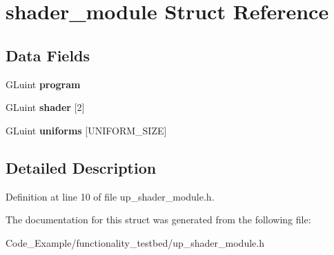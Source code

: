 \hypertarget{structshader__module}{}\section{shader\+\_\+module Struct Reference}
\label{structshader__module}
\subsection*{Data Fields}
\begin{DoxyCompactItemize}
\item 
\hypertarget{structshader__module_a27d8510c93324412d38a888eddee2852}{}G\+Luint {\bfseries program}\label{structshader__module_a27d8510c93324412d38a888eddee2852}

\item 
\hypertarget{structshader__module_ab70b84ace031933b1b360b4e0942ead2}{}G\+Luint {\bfseries shader} \mbox{[}2\mbox{]}\label{structshader__module_ab70b84ace031933b1b360b4e0942ead2}

\item 
\hypertarget{structshader__module_a3b49a2c6d2326864bfb7c644dcf82ced}{}G\+Luint {\bfseries uniforms} \mbox{[}U\+N\+I\+F\+O\+R\+M\+\_\+\+S\+I\+Z\+E\mbox{]}\label{structshader__module_a3b49a2c6d2326864bfb7c644dcf82ced}

\end{DoxyCompactItemize}


\subsection{Detailed Description}


Definition at line 10 of file up\+\_\+shader\+\_\+module.\+h.



The documentation for this struct was generated from the following file\+:\begin{DoxyCompactItemize}
\item 
Code\+\_\+\+Example/functionality\+\_\+testbed/up\+\_\+shader\+\_\+module.\+h\end{DoxyCompactItemize}

